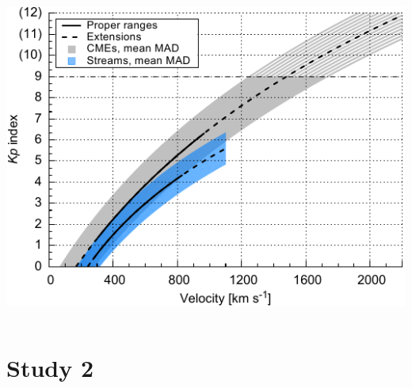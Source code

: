 \documentclass[11pt,aspectratio=1610]{beamer}	%
\newcommand{\captionoftiny}[2]{\captionof{#1}{\color{gray} \tiny #2}}
\begin{document}
\begin{frame}[c]{}{}
	\begin{columns}[c]
		
		\includegraphics[width=\textwidth]{../figures_of_mine/chapter2/Kp_2dhistogram_V_sws123_fit_f3.pdf}


	\end{columns}
\end{frame}


\section{Study 2}
\end{document}
